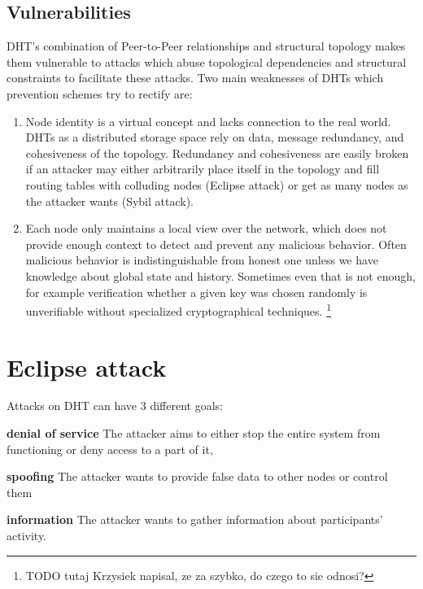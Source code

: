 \subsection{Vulnerabilities}
  DHT's combination of Peer-to-Peer relationships and structural topology makes
  them vulnerable to attacks which abuse topological dependencies and structural
  constraints to facilitate these attacks. Two main weaknesses of DHTs which
  prevention schemes try to rectify are:

  \begin{enumerate}
    \item Node identity is a virtual concept and lacks connection to the real
      world. DHTs as a distributed storage space rely on data, message
      redundancy, and cohesiveness of the topology. Redundancy and cohesiveness
      are easily broken if an attacker may either arbitrarily place itself in
      the topology and fill routing tables with colluding nodes (Eclipse attack)
      or get as many nodes as the attacker wants (Sybil attack).

    \item Each node only maintains a local view over the network, which does not
      provide enough context to detect and prevent any malicious behavior. Often
      malicious behavior is indistinguishable from honest one unless we have
      knowledge about global state and history.  Sometimes even that is not
      enough, for example verification whether a given key was chosen randomly
      is unverifiable without specialized cryptographical techniques. 
     \footnote{TODO tutaj Krzysiek napisal, ze za szybko, do czego to sie odnosi?}
  \end{enumerate}

\section{Eclipse attack}
  Attacks on DHT can have 3 different goals:
  \begin{description}
    \item{\textbf{denial of service}} The attacker aims to either stop the
      entire system from functioning or deny access to a part of it,
    \item{\textbf{spoofing}} The attacker wants to provide false data to other
      nodes or control them
    \item{\textbf{information}} The attacker wants to gather information about
      participants' activity.
  \end{description}

